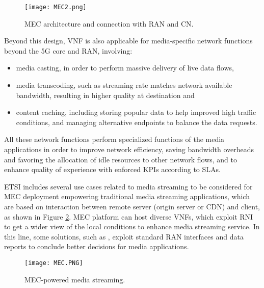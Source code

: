\begin{figure}[htp]
	\centering
	\texttt{[image: MEC2.png]}
	\caption{MEC architecture and connection with RAN and CN.}
	\label{fig:IEEECOMSTmec2}
	\vspace{-0.5cm}
\end{figure}

Beyond this design, VNF is also applicable for media-specific network functions beyond the 5G core and RAN, involving:
\begin{itemize}
	\item media casting, in order to perform massive delivery of live data flows,
	\item media transcoding, such as streaming rate matches network available bandwidth, resulting in higher quality at destination and
	\item content caching, including storing popular data to help improved high traffic conditions, and managing alternative endpoints to balance the data requests.
\end{itemize}

All these network functions perform specialized functions of the media applications in order to improve network efficiency, saving bandwidth overheads and favoring the allocation of idle resources to other network flows, and to enhance quality of experience with enforced KPIs according to SLAs.

ETSI includes several use cases related to media streaming to be considered for MEC deployment \cite{etsigsmec002} empowering traditional media streaming applications, which are based on interaction between remote server (origin server or CDN) and client, as shown in Figure \ref{fig:IEEECOMSTmec}. MEC platform can host diverse VNFs, which exploit RNI to get a wider view of the local conditions to enhance media streaming service. In this line, some solutions, such as \cite{giannone2020, Martin2019, Li2016-2}, exploit standard RAN interfaces and data reports to conclude better decisions for media applications.

\begin{figure}[htp]
	\centering
	\texttt{[image: MEC.PNG]}
	\caption{MEC-powered media streaming.}
	\label{fig:IEEECOMSTmec}
	\vspace{-0.5cm}
\end{figure}

